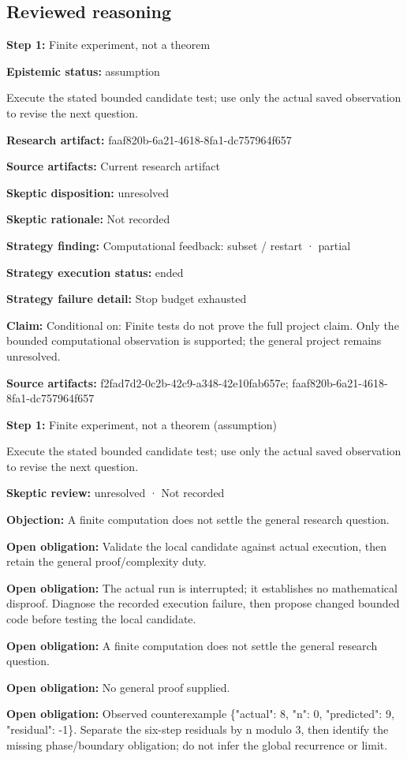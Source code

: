\documentclass[11pt]{article}
\begin{document}
\subsection{Reviewed reasoning}
\textbf{Step 1:} Finite experiment, not a theorem\par
\textbf{Epistemic status:} assumption\par
Execute the stated bounded candidate test; use only the actual saved observation to revise the next question.\par
\textbf{Research artifact:} faaf820b-6a21-4618-8fa1-dc757964f657\par
\textbf{Source artifacts:} Current research artifact\par
\textbf{Skeptic disposition:} unresolved\par
\textbf{Skeptic rationale:} Not recorded\par
\textbf{Strategy finding:} Computational feedback: subset / restart · partial\par
\textbf{Strategy execution status:} ended\par
\textbf{Strategy failure detail:} Stop budget exhausted\par
\textbf{Claim:} Conditional on: Finite tests do not prove the full project claim. Only the bounded computational observation is supported; the general project remains unresolved.\par
\textbf{Source artifacts:} f2fad7d2-0c2b-42c9-a348-42e10fab657e; faaf820b-6a21-4618-8fa1-dc757964f657\par
\textbf{Step 1:} Finite experiment, not a theorem (assumption)\par
Execute the stated bounded candidate test; use only the actual saved observation to revise the next question.\par
\textbf{Skeptic review:} unresolved · Not recorded\par
\textbf{Objection:} A finite computation does not settle the general research question.\par
\textbf{Open obligation:} Validate the local candidate against actual execution, then retain the general proof/complexity duty.\par
\textbf{Open obligation:} The actual run is interrupted; it establishes no mathematical disproof. Diagnose the recorded execution failure, then propose changed bounded code before testing the local candidate.\par
\textbf{Open obligation:} A finite computation does not settle the general research question.\par
\textbf{Open obligation:} No general proof supplied.\par
\textbf{Open obligation:} Observed counterexample \{"actual": 8, "n": 0, "predicted": 9, "residual": -1\}. Separate the six-step residuals by n modulo 3, then identify the missing phase/boundary obligation; do not infer the global recurrence or limit.\par
\end{document}
